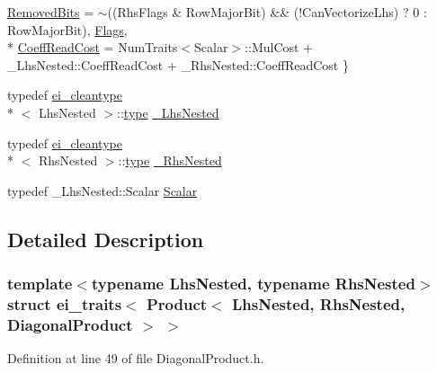 \begin{DoxyCompactItemize}
\hyperlink{structei__traits_3_01_product_3_01_lhs_nested_00_01_rhs_nested_00_01_diagonal_product_01_4_01_4_ae88383b36938bec3082772ff061c4982a903002d5dac5350cc148e616aa7dfa5b}{Removed\-Bits} = $\sim$((Rhs\-Flags \& Row\-Major\-Bit) \&\& (!\-Can\-Vectorize\-Lhs) ? 0 \-: Row\-Major\-Bit), 
\hyperlink{structei__traits_3_01_product_3_01_lhs_nested_00_01_rhs_nested_00_01_diagonal_product_01_4_01_4_ae88383b36938bec3082772ff061c4982a773e9500604c7984b7c28ffe9892a43e}{Flags}, 
\\*
\hyperlink{structei__traits_3_01_product_3_01_lhs_nested_00_01_rhs_nested_00_01_diagonal_product_01_4_01_4_ae88383b36938bec3082772ff061c4982a6fac01b2f1c81787c777685084546bfe}{Coeff\-Read\-Cost} = Num\-Traits$<$Scalar$>$\-:\-:Mul\-Cost + \-\_\-\-Lhs\-Nested\-:\-:Coeff\-Read\-Cost + \-\_\-\-Rhs\-Nested\-:\-:Coeff\-Read\-Cost
 \}
\item 
typedef \hyperlink{structei__cleantype}{ei\-\_\-cleantype}\\*
$<$ Lhs\-Nested $>$\-::\hyperlink{glext_8h_a7d05960f4f1c1b11f3177dc963a45d86}{type} \hyperlink{structei__traits_3_01_product_3_01_lhs_nested_00_01_rhs_nested_00_01_diagonal_product_01_4_01_4_a46bed6c0520fb5701ba592e6768e823e}{\-\_\-\-Lhs\-Nested}
\item 
typedef \hyperlink{structei__cleantype}{ei\-\_\-cleantype}\\*
$<$ Rhs\-Nested $>$\-::\hyperlink{glext_8h_a7d05960f4f1c1b11f3177dc963a45d86}{type} \hyperlink{structei__traits_3_01_product_3_01_lhs_nested_00_01_rhs_nested_00_01_diagonal_product_01_4_01_4_ab7f94eb26f2e5f451245695e58d680fc}{\-\_\-\-Rhs\-Nested}
\item 
typedef \-\_\-\-Lhs\-Nested\-::\-Scalar \hyperlink{structei__traits_3_01_product_3_01_lhs_nested_00_01_rhs_nested_00_01_diagonal_product_01_4_01_4_ab10484657f1e9ad1e6bcc5450e274e98}{Scalar}
\end{DoxyCompactItemize}


\subsection{Detailed Description}
\subsubsection*{template$<$typename Lhs\-Nested, typename Rhs\-Nested$>$struct ei\-\_\-traits$<$ Product$<$ Lhs\-Nested, Rhs\-Nested, Diagonal\-Product $>$ $>$}



Definition at line 49 of file Diagonal\-Product.\-h.



